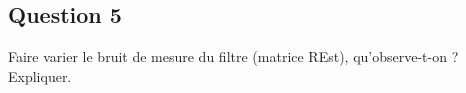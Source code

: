 \documentclass[../CSC_5RO12_TA_TP2.tex]{subfiles}
\begin{document}
\subsection{Question 5}

Faire varier le bruit de mesure du filtre (matrice REst), qu'observe-t-on ? Expliquer.
\end{document}
